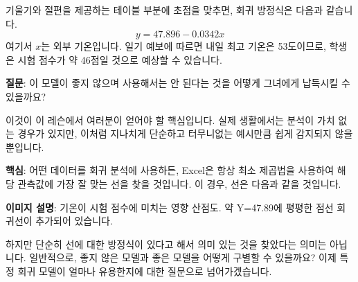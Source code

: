 \documentclass[11pt,a4paper]{article}
\theoremstyle{definition}
\begin{document}
\begin{tcolorbox}[examplebox, title=예시: 기온이 시험 점수에 미치는 영향]
기울기와 절편을 제공하는 테이블 부분에 초점을 맞추면, 회귀 방정식은 다음과 같습니다.
\begin{equation*}
y = 47.896 - 0.0342x
\end{equation*}
여기서 $x$는 외부 기온입니다. 일기 예보에 따르면 내일 최고 기온은 53도이므로, 학생은 시험 점수가 약 46점일 것으로 예상할 수 있습니다.

\textbf{질문}: 이 모델이 좋지 않으며 사용해서는 안 된다는 것을 어떻게 그녀에게 납득시킬 수 있을까요?

이것이 이 레슨에서 여러분이 얻어야 할 핵심입니다. 실제 생활에서는 분석이 가치 없는 경우가 있지만, 이처럼 지나치게 단순하고 터무니없는 예시만큼 쉽게 감지되지 않을 뿐입니다.

\textbf{핵심}: 어떤 데이터를 회귀 분석에 사용하든, Excel은 항상 최소 제곱법을 사용하여 해당 관측값에 가장 잘 맞는 선을 찾을 것입니다. 이 경우, 선은 다음과 같을 것입니다.

\begin{center}
\end{center}
\textbf{이미지 설명}: 기온이 시험 점수에 미치는 영향 산점도. 약 Y=47.89에 평평한 점선 회귀선이 추가되어 있습니다.

하지만 단순히 선에 대한 방정식이 있다고 해서 의미 있는 것을 찾았다는 의미는 아닙니다. 일반적으로, 좋지 않은 모델과 좋은 모델을 어떻게 구별할 수 있을까요? 이제 특정 회귀 모델이 얼마나 유용한지에 대한 질문으로 넘어가겠습니다.
\end{tcolorbox}
\end{document}
